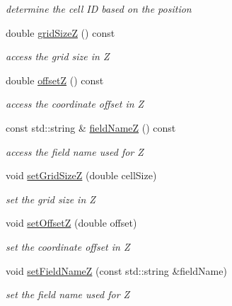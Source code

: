 \begin{DoxyCompactItemize}
\begin{DoxyCompactList}\small\item\em determine the cell ID based on the position \end{DoxyCompactList}\item 
double \hyperlink{class_d_d4hep_1_1_d_d_segmentation_1_1_cartesian_grid_x_y_z_ab1f1df187bae769c14fe5df39c257cc6}{grid\+SizeZ} () const
\begin{DoxyCompactList}\small\item\em access the grid size in Z \end{DoxyCompactList}\item 
double \hyperlink{class_d_d4hep_1_1_d_d_segmentation_1_1_cartesian_grid_x_y_z_a6ee56704366352e0982d33dd349eede1}{offsetZ} () const
\begin{DoxyCompactList}\small\item\em access the coordinate offset in Z \end{DoxyCompactList}\item 
const std\+::string \& \hyperlink{class_d_d4hep_1_1_d_d_segmentation_1_1_cartesian_grid_x_y_z_a1c8ad1c7a2b4b3da247b78dde6a3fa18}{field\+NameZ} () const
\begin{DoxyCompactList}\small\item\em access the field name used for Z \end{DoxyCompactList}\item 
void \hyperlink{class_d_d4hep_1_1_d_d_segmentation_1_1_cartesian_grid_x_y_z_a1350853bf74f0de0d12b1fa1bf9c1f09}{set\+Grid\+SizeZ} (double cell\+Size)
\begin{DoxyCompactList}\small\item\em set the grid size in Z \end{DoxyCompactList}\item 
void \hyperlink{class_d_d4hep_1_1_d_d_segmentation_1_1_cartesian_grid_x_y_z_a1026999b123d8140f6e710abf9977cef}{set\+OffsetZ} (double offset)
\begin{DoxyCompactList}\small\item\em set the coordinate offset in Z \end{DoxyCompactList}\item 
void \hyperlink{class_d_d4hep_1_1_d_d_segmentation_1_1_cartesian_grid_x_y_z_a80a938d9852e6dcca0b81365b347f6ea}{set\+Field\+NameZ} (const std\+::string \&field\+Name)
\begin{DoxyCompactList}\small\item\em set the field name used for Z \end{DoxyCompactList}\item 

\end{DoxyCompactItemize}
